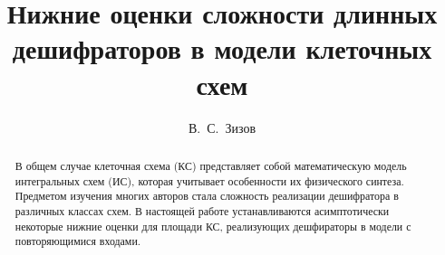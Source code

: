 

\usepackage{todonotes} %
\usepackage{amssymb }

\usepackage[russian]{nla}

%
%


%




%
\fi

\title{Нижние оценки сложности длинных дешифраторов в модели клеточных схем}
\author{В.~С.~Зизов   %
}


\maketitle

\begin{abstract}
В общем случае клеточная схема (КС) представляет собой математическую модель интегральных схем (ИС), которая учитывает особенности их физического синтеза. Предметом изучения многих авторов стала сложность реализации дешифратора в различных классах схем. В настоящей работе устанавливаются асимптотически некоторые нижние оценки для площади КС, реализующих дешфираторы в модели с повторяющимися входами.
\end{abstract}


